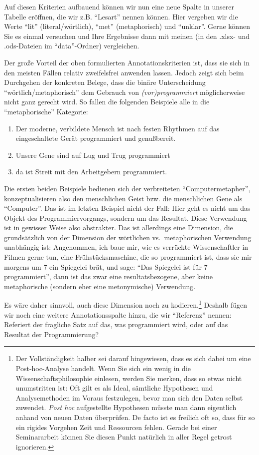 \documentclass[]{article}
\let\rmarkdownfootnote\footnote%
\def\footnote{\protect\rmarkdownfootnote}
\begin{document}
Auf diesen Kriterien aufbauend können wir nun eine neue Spalte in
unserer Tabelle eröffnen, die wir z.B. \enquote{Lesart} nennen können.
Hier vergeben wir die Werte \enquote{lit} (literal/wörtlich),
\enquote{met} (metaphorisch) und \enquote{unklar}. Gerne können Sie es
einmal versuchen und Ihre Ergebnisse dann mit meinen (in den .xlsx- und
.ods-Dateien im \enquote{data}-Ordner) vergleichen.

Der große Vorteil der oben formulierten Annotationskriterien ist, dass
sie sich in den meisten Fällen relativ zweifelsfrei anwenden lassen.
Jedoch zeigt sich beim Durchgehen der konkreten Belege, dass die binäre
Unterscheidung \enquote{wörtlich/metaphorisch} dem Gebrauch von
\emph{(vor)programmiert} möglicherweise nicht ganz gerecht wird. So
fallen die folgenden Beispiele alle in die \enquote{metaphorische}
Kategorie:

\begin{enumerate}
\def\labelenumi{(\arabic{enumi})}
\item
  Der moderne, verbildete Mensch ist nach festen Rhythmen auf das
  eingeschaltete Gerät programmiert und genußbereit.
\item
  Unsere Gene sind auf Lug und Trug programmiert
\item
  da ist Streit mit den Arbeitgebern programmiert.
\end{enumerate}

Die ersten beiden Beispiele bedienen sich der verbreiteten
\enquote{Computermetapher}, konzeptualisieren also den menschlichen
Geist bzw. die menschlichen Gene als \enquote{Computer}. Das ist im
letzten Beispiel nicht der Fall: Hier geht es nicht um das Objekt des
Programmiervorgangs, sondern um das Resultat. Diese Verwendung ist in
gewisser Weise also abstrakter. Das ist allerdings eine Dimension, die
grundsätzlich von der Dimension der wörtlichen vs.~metaphorischen
Verwendung unabhängig ist: Angenommen, ich baue mir, wie es verrückte
Wissenschaftler in Filmen gerne tun, eine Frühstücksmaschine, die so
programmiert ist, dass sie mir morgens um 7 ein Spiegelei brät, und
sage: \enquote{Das Spiegelei ist für 7 programmiert}, dann ist das zwar
eine resultatsbezogene, aber keine metaphorische (sondern eher eine
metonymische) Verwendung.

Es wäre daher sinnvoll, auch diese Dimension noch zu kodieren.\footnote{Der
  Vollständigkeit halber sei darauf hingewiesen, dass es sich dabei um
  eine Post-hoc-Analyse handelt. Wenn Sie sich ein wenig in die
  Wissenschaftsphilosophie einlesen, werden Sie merken, dass so etwas
  nicht unumstritten ist: Oft gilt es als Ideal, sämtliche Hypothesen
  und Analysemethoden im Voraus festzulegen, bevor man sich den Daten
  selbst zuwendet. \emph{Post hoc} aufgestellte Hypothesen müsste man
  dann eigentlich anhand von neuen Daten überprüfen. De facto ist es
  freilich oft so, dass für so ein rigides Vorgehen Zeit und Ressourcen
  fehlen. Gerade bei einer Seminararbeit können Sie diesen Punkt
  natürlich in aller Regel getrost ignorieren.} Deshalb fügen wir noch
eine weitere Annotationsspalte hinzu, die wir \enquote{Referenz} nennen:
Referiert der fragliche Satz auf das, was programmiert wird, oder auf
das Resultat der Programmierung?
\end{document}
